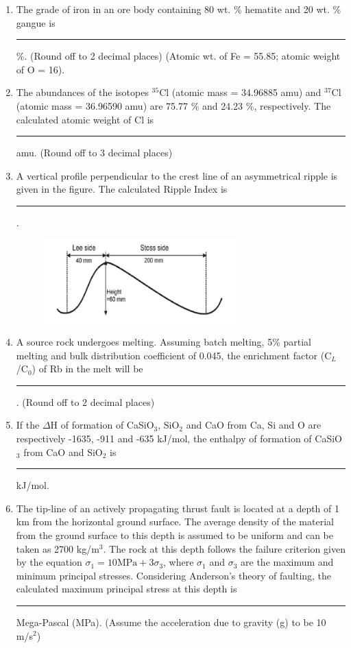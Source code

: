 \documentclass[journal,12pt,onecolumn]{IEEEtran}
\begin{document}
\begin{enumerate}
\hfill{}

\item The grade of iron in an ore body containing 80 wt. \% hematite and 20 wt. \% gangue is \rule{1cm}{0.15mm} \%. (Round off to 2 decimal places) (Atomic wt. of Fe = 55.85; atomic weight of O = 16).

\hfill{}

\item The abundances of the isotopes $^{35}$Cl (atomic mass = 34.96885 amu) and $^{37}$Cl (atomic mass = 36.96590 amu) are 75.77 \% and 24.23 \%, respectively. The calculated atomic weight of Cl is \rule{1cm}{0.15mm} amu. (Round off to 3 decimal places)

\hfill{}

\item A vertical profile perpendicular to the crest line of an asymmetrical ripple is given in the figure. The calculated Ripple Index is \rule{1cm}{0.15mm}.

\hfill{}
\begin{figure}[h!]
    \centering
    \includegraphics[width=0.7\textwidth]{figs/fig11.png}
    \caption{}
    \label{fig:partB_geo_q23}
\end{figure}

\item A source rock undergoes melting. Assuming batch melting, 5\% partial melting and bulk distribution coefficient of 0.045, the enrichment factor (C$_L$/C$_0$) of Rb in the melt will be \rule{1cm}{0.15mm}. (Round off to 2 decimal places)

\hfill{}

\item If the $\Delta$H of formation of CaSiO$_3$, SiO$_2$ and CaO from Ca, Si and O are respectively -1635, -911 and -635 kJ/mol, the enthalpy of formation of CaSiO$_3$ from CaO and SiO$_2$ is \rule{1cm}{0.15mm} kJ/mol.

\hfill{}

\item The tip-line of an actively propagating thrust fault is located at a depth of 1 km from the horizontal ground surface. The average density of the material from the ground surface to this depth is assumed to be uniform and can be taken as 2700 kg/m$^3$. The rock at this depth follows the failure criterion given by the equation $\sigma_1 = 10 \text{MPa} + 3\sigma_3$, where $\sigma_1$ and $\sigma_3$ are the maximum and minimum principal stresses. Considering Anderson's theory of faulting, the calculated maximum principal stress at this depth is \rule{1cm}{0.15mm} Mega-Pascal (MPa). (Assume the acceleration due to gravity (g) to be 10 m/s$^2$)


\end{enumerate}
\end{document}
